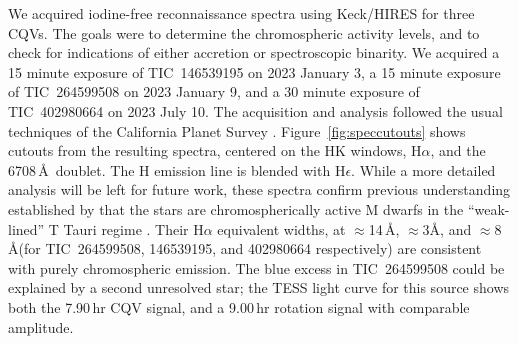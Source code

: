 \documentclass[11pt,twocolumn,tighten]{aastex63}
\begin{document}
We acquired iodine-free reconnaissance spectra using Keck/HIRES for
three CQVs.  The goals were to determine the chromospheric activity
levels, and to check for indications of either accretion or
spectroscopic binarity.  We acquired a 15 minute exposure of
TIC~146539195 on 2023 January 3, a 15 minute exposure of TIC~264599508
on 2023 January 9, and a 30 minute exposure of TIC~402980664 on 2023
July 10.  The acquisition and analysis followed the usual techniques
of the California Planet Survey \citep{2010ApJ...721.1467H}.
Figure~\ref{fig:speccutouts} shows cutouts from the resulting spectra,
centered on the  HK windows, H$\alpha$, and the 
6708\,\AA\ doublet.  The  H emission line is blended with
H$\epsilon$.  While a more detailed analysis will be left for future
work, these spectra confirm previous understanding established by
\citet{2017AJ....153..152S} that the stars are chromospherically
active M dwarfs in the ``weak-lined'' T Tauri regime
\citep[e.g.][Figure~15]{2019AJ....157...85B}.  Their H$\alpha$
equivalent widths, at $\approx$14\,\AA, $\approx$3\AA, and
$\approx$8\,\AA (for TIC~264599508, 146539195, and 402980664
respectively) are consistent with purely chromospheric emission.  The
blue excess in TIC~264599508 could be explained by a second unresolved
star; the TESS light curve for this source shows both the 7.90\,hr CQV
signal, and a 9.00\,hr rotation signal with comparable amplitude.

\begin{figure*}[!t]
	\begin{center}

	\vspace{-1.1cm}

	\vspace{-1.1cm}
	\end{center}
	\vspace{-0.4cm}
	\caption{
		{\bf Spectral age and activity diagnostics for three CQVs}.
		Wavelengths are in air;
		the continuum normalization is relative to the entire order.
		The H$\alpha$ emission strength classifies the stars as weak-lined
		T Tauris.
		The lithium detection for TIC~146539195 is consistent with its
		mass and $\beta$~Pic membership;
		the non-detections for TIC~402980664 and TIC~264599508
		are consistent with the $\approx$42\,Myr age implied by their membership
		in the Columba moving group.
	}
	\label{fig:speccutouts}
\end{figure*}
\end{document}
